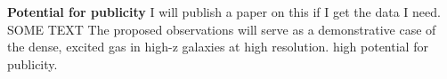 \documentclass[12pt,a4paper]{article}  %
\newcommand{\rarr}{$\rightarrow$}
\newcommand{\aco}{\mbox{CO($J$=1\rarr0)}\xspace}
\newcommand{\bco}{\mbox{CO($J$=2\rarr1)}\xspace}
\newcommand{\eco}{\mbox{CO($J$=5\rarr4)}\xspace}
\newcommand{\ahcn}{\mbox{HCN($J$=1\rarr0)}\xspace}
\newcommand{\dhcn}{\mbox{HCN($J$=4\rarr3)}\xspace}
\newcommand{\dhcop}{\mbox{HCO$^+$($J$=4\rarr3) }}
\newcommand{\kms}{km\,s$^{-1}$\xspace}
\newcommand{\pmOne}{\mbox{$^{-1}$}\xspace}
\newcommand{\Fig}[1]{Fig.~\ref{fig:#1}}
\begin{document}

{\bf Potential for publicity} 
I will publish a paper on this if I get the data I need. SOME TEXT
The proposed observations will serve as a demonstrative case
of the dense, excited gas in high-z galaxies at high resolution. 
high potential for publicity. 
\end{document}
